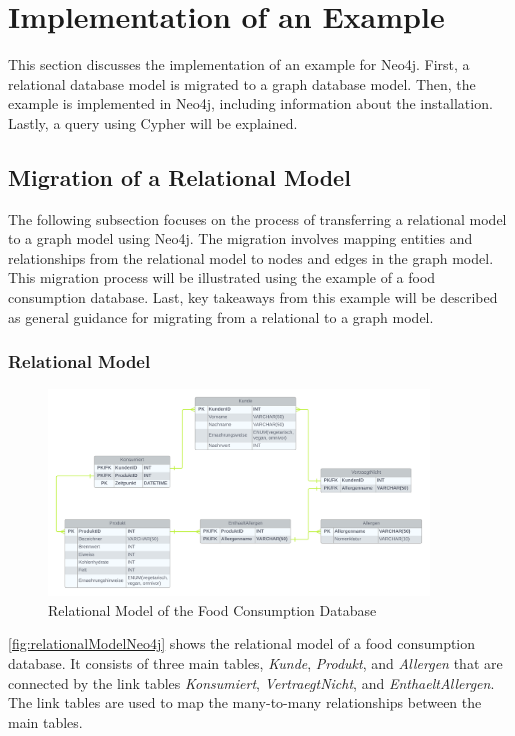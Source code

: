 \section{Implementation of an Example}\label{sec:implementationExampleNeo4j}

This section discusses the implementation of an example for Neo4j. First, a relational database model is migrated to a graph database model. Then, the example is implemented in Neo4j, including information about the installation. Lastly, a query using Cypher will be explained.
\subsection{Migration of a Relational Model}\label{subsec:migrationRelationModelNeo4j}

The following subsection focuses on the process of transferring a relational model to a graph model using Neo4j. The migration involves mapping entities and relationships from the relational model to nodes and edges in the graph model. This migration process will be illustrated using the example of a food consumption database. Last, key takeaways from this example will be described as general guidance for migrating from a relational to a graph model.

\subsubsection*{Relational Model}

\begin{figure}[H]
    \centering
    \caption{Relational Model of the Food Consumption Database}\label{fig:relationalModelNeo4j}
    \includegraphics[width=0.9\textwidth]{images/neo4j_example_relational_model.png}
\end{figure}

\autoref{fig:relationalModelNeo4j} shows the relational model of a food consumption database. It consists of three main tables, \textit{Kunde}, \textit{Produkt}, and \textit{Allergen} that are connected by the link tables \textit{Konsumiert}, \textit{VertraegtNicht}, and \textit{EnthaeltAllergen}. The link tables are used to map the many-to-many relationships between the main tables.

